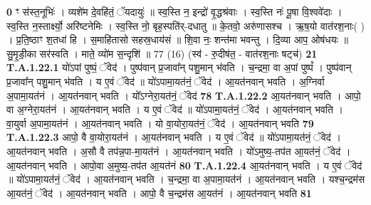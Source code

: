 \documentclass[17pt]{extarticle}
\begin{document}
                  \newline
                                                                  \textbf{ } \newline
                   \textbf{ 0} \newline
                  \newline
                                                        ꣳ स॑स्त॒नूभिः॑ । व्यशे॑म दे॒वहि॑तं॒ ॅयदायुः॑ ॥ स्व॒स्ति न॒ इन्द्रो॑ वृ॒द्धश्र॑वाः । स्व॒स्ति नः॑ पू॒षा वि॒श्ववे॑दाः । स्व॒स्ति न॒स्तार्क्ष्यो॒ अरि॑ष्टनेमिः । स्व॒स्ति नो॒ बृह॒स्पति॑र्-दधातु ॥ के॒तवो॒ अरु॑णासश्च । ऋ॒ष॒यो वात॑रश॒नाः( ) । प्र॒ति॒ष्ठाꣳ श॒तधा॑ हि । स॒माहि॑तासो सहस्र॒धाय॑सं ॥ शि॒वा नः॒ शन्त॑मा भवन्तु । दि॒व्या आप॒ ओष॑धयः ॥ सु॒मृ॒डी॒का सर॑स्वति । माते॒ व्यो॑म स॒न्दृशि॑ ॥ 77 (16) (स्व॑ - रु॒दीष॑त॒ - वात॑रश॒नाः षट्च॑) \textbf{21} \newline \newline
                                \textbf{ T.A.1.22.1} \newline
                  यो॑ऽपां पुष्पं॒ ॅवेद॑ । पुष्प॑वान् प्र॒जावा᳚न् पशु॒मान् भ॑वति । च॒न्द्रमा॒ वा अ॒पां पुष्पं᳚ । पुष्प॑वान् प्र॒जावा᳚न् पशु॒मान् भ॑वति ।  य ए॒वं ॅवेद॑ ॥ यो॑ऽपामा॒यत॑नं॒ ॅवेद॑ । आ॒यत॑नवान् भवति । अ॒ग्निर्वा अ॒पामा॒यत॑नं । आ॒यत॑नवान् भवति । यो᳚ऽग्नेरा॒यत॑नं॒ ॅवेद॑ \textbf{ 78} \newline
                  \newline
                                                                  \textbf{ T.A.1.22.2} \newline
                  आ॒यत॑नवान् भवति । आपो॒ वा अ॒ग्नेरा॒यत॑नं । आ॒यत॑नवान् भवति । य ए॒वं ॅवेद॑ ॥ यो॑ऽपामा॒॒यत॑नं॒ ॅवेद॑ । आ॒यत॑नवान् भवति ।  वा॒युर्वा अ॒पामा॒यत॑नं । आ॒यत॑नवान् भवति ।  यो वा॒योरा॒यत॑नं॒ ॅवेद॑ । आ॒यत॑नवान् भवति \textbf{ 79} \newline
                  \newline
                                                                  \textbf{ T.A.1.22.3} \newline
                  आपो॒ वै वा॒योरा॒यत॑नं । आ॒यत॑नवान् भवति । य ए॒वं ॅवेद॑ ॥ यो॑ऽपामा॒यत॑नं॒ ॅवेद॑ । आ॒यत॑नवान् भवति । अ॒सौ वै तप॑न्न॒पा-मा॒यत॑नं । आ॒यत॑नवान् भवति । यो॑ऽमुष्य॒-तप॑त आ॒यत॑नं॒ ॅवेद॑ । आ॒यत॑नवान् भवति । आपो॒वा अ॒मुष्य॒-तप॑त आ॒यत॑नं \textbf{ 80} \newline
                  \newline
                                                                  \textbf{ T.A.1.22.4} \newline
                  आ॒यत॑नवान् भवति । य ए॒वं ॅवेद॑ ॥ यो॑ऽपामा॒यत॑नं॒ ॅवेद॑ । आ॒यत॑नवान् भवति । च॒न्द्रमा॒ वा अ॒पामा॒यत॑नं । आ॒यत॑नवान् भवति ।  यश्च॒न्द्रम॑स आ॒यत॑नं॒ ॅवेद॑ । आ॒यत॑नवान् भवति । आपो॒ वै च॒न्द्रम॑स आ॒यत॑नं । आ॒यत॑नवान् भवति \textbf{ 81} \newline
\end{document}
